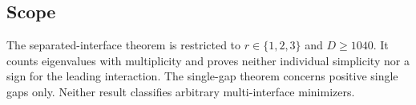 \subsection{Scope}

The separated-interface theorem is restricted to
\(r\in\{1,2,3\}\) and \(D\geq1040\). It counts eigenvalues with multiplicity
and proves neither individual simplicity nor a sign for the leading
interaction. The single-gap theorem concerns positive single gaps only.
Neither result classifies arbitrary multi-interface minimizers.
